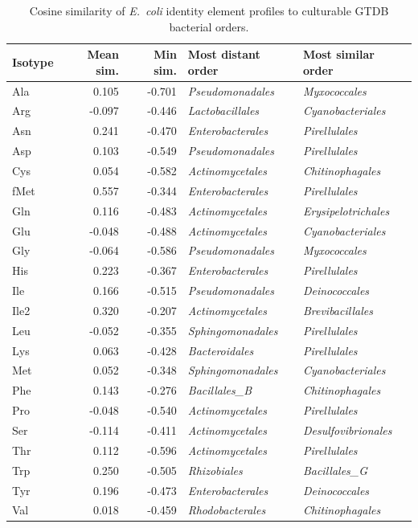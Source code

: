 \begin{table}[!ht]
\centering
\small
\caption{Cosine similarity of \textit{E.~coli} identity element profiles to culturable GTDB bacterial orders.}
\label{tab:ecoli_bacteria_culturable}
\begin{tabular}{lrrll}
\toprule
Isotype & Mean sim. & Min sim. & Most distant order & Most similar order \\
\midrule
  Ala & 0.105 & -0.701 & \textit{Pseudomonadales} & \textit{Myxococcales} \\
  Arg & -0.097 & -0.446 & \textit{Lactobacillales} & \textit{Cyanobacteriales} \\
  Asn & 0.241 & -0.470 & \textit{Enterobacterales} & \textit{Pirellulales} \\
  Asp & 0.103 & -0.549 & \textit{Pseudomonadales} & \textit{Pirellulales} \\
  Cys & 0.054 & -0.582 & \textit{Actinomycetales} & \textit{Chitinophagales} \\
  fMet & 0.557 & -0.344 & \textit{Enterobacterales} & \textit{Pirellulales} \\
  Gln & 0.116 & -0.483 & \textit{Actinomycetales} & \textit{Erysipelotrichales} \\
  Glu & -0.048 & -0.488 & \textit{Actinomycetales} & \textit{Cyanobacteriales} \\
  Gly & -0.064 & -0.586 & \textit{Pseudomonadales} & \textit{Myxococcales} \\
  His & 0.223 & -0.367 & \textit{Enterobacterales} & \textit{Pirellulales} \\
  Ile & 0.166 & -0.515 & \textit{Pseudomonadales} & \textit{Deinococcales} \\
  Ile2 & 0.320 & -0.207 & \textit{Actinomycetales} & \textit{Brevibacillales} \\
  Leu & -0.052 & -0.355 & \textit{Sphingomonadales} & \textit{Pirellulales} \\
  Lys & 0.063 & -0.428 & \textit{Bacteroidales} & \textit{Pirellulales} \\
  Met & 0.052 & -0.348 & \textit{Sphingomonadales} & \textit{Cyanobacteriales} \\
  Phe & 0.143 & -0.276 & \textit{Bacillales\_B} & \textit{Chitinophagales} \\
  Pro & -0.048 & -0.540 & \textit{Actinomycetales} & \textit{Pirellulales} \\
  Ser & -0.114 & -0.411 & \textit{Actinomycetales} & \textit{Desulfovibrionales} \\
  Thr & 0.112 & -0.596 & \textit{Actinomycetales} & \textit{Pirellulales} \\
  Trp & 0.250 & -0.505 & \textit{Rhizobiales} & \textit{Bacillales\_G} \\
  Tyr & 0.196 & -0.473 & \textit{Enterobacterales} & \textit{Deinococcales} \\
  Val & 0.018 & -0.459 & \textit{Rhodobacterales} & \textit{Chitinophagales} \\
\bottomrule
\end{tabular}
\end{table}